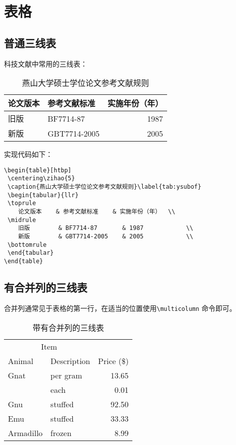 \chapter{表格}
\label{chap:table}

\section{普通三线表}
科技文献中常用的三线表：
\begin{table}[htbp]
 \centering{}
 \caption{燕山大学硕士学位论文参考文献规则}\label{tab:ysubof}
 \begin{tabular}{llr}
 \toprule
    论文版本    & 参考文献标准    & 实施年份（年）  \\
 \midrule
    旧版        & BF7714-87       & 1987            \\
    新版        & GBT7714-2005    & 2005            \\
 \bottomrule
 \end{tabular}
\end{table}

实现代码如下：
\begin{verbatim}
\begin{table}[htbp]
 \centering\zihao{5}
 \caption{燕山大学硕士学位论文参考文献规则}\label{tab:ysubof}
 \begin{tabular}{llr}
 \toprule
    论文版本    & 参考文献标准    & 实施年份（年）  \\
 \midrule
    旧版        & BF7714-87       & 1987            \\
    新版        & GBT7714-2005    & 2005            \\
 \bottomrule
 \end{tabular}
\end{table}
\end{verbatim}

\section{有合并列的三线表}
合并列通常见于表格的第一行，在适当的位置使用\verb|\multicolumn| 命令即可。
\begin{table}[htbp]
\centering{}
\caption{带有合并列的三线{表}}\label{tab:test}
\begin{tabular}{llr} \toprule
\multicolumn{2}{c}{Item} \\ \cmidrule(r){1-2}
Animal & Description & Price (\$)\\ \midrule
Gnat & per gram & 13.65 \\
& each & 0.01 \\
Gnu & stuffed & 92.50 \\
Emu & stuffed & 33.33 \\
Armadillo & frozen & 8.99 \\ \bottomrule
\end{tabular}
\end{table}


